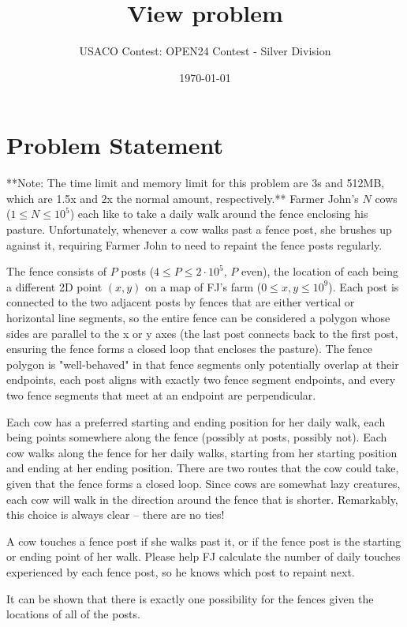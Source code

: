 \documentclass[12pt]{article}
\title{View problem}
\author{USACO Contest: OPEN24 Contest - Silver Division}
\date{\today}
\begin{document}
\maketitle

\section*{Problem Statement}


**Note: The time limit and memory limit for this problem are 3s and 512MB, which are
1.5x and 2x the normal amount, respectively.**
Farmer John's $N$ cows ($1 \leq N \leq 10^5$) each like to take a daily walk
around the fence enclosing his pasture.  Unfortunately, whenever a cow walks
past a fence post, she brushes up against it, requiring Farmer John to need to
repaint the fence posts regularly.

The fence consists of $P$ posts ($4 \leq P \leq 2\cdot 10^5$, $P$ even), the
location of each being a different 2D point $(x,y)$ on a map of FJ's farm
($0 \leq x, y \leq 10^9$).  Each post is connected to the two adjacent posts by
fences that are either vertical  or horizontal line segments, so the entire
fence can be considered a polygon whose sides are parallel to the x or y axes
(the last post connects back to the first post, ensuring the fence forms a
closed loop that encloses the pasture).  The fence polygon is "well-behaved" in
that fence segments only potentially overlap at their endpoints, each post
aligns with exactly  two fence segment endpoints, and every two fence segments
that meet at an endpoint are perpendicular. 

Each cow has a preferred starting and ending position for her daily walk, each
being points somewhere along the fence (possibly at posts, possibly not).  Each
cow walks along the fence for her daily walks, starting from her starting
position and ending at her ending position.  There are two routes that the cow
could take, given that the fence forms a closed loop.  Since cows are somewhat
lazy creatures, each cow will walk in the direction around the fence that is
shorter. Remarkably, this choice is always clear -- there are no ties!

A cow touches a fence post if she walks past it, or if the fence post is the
starting or ending point of her walk.  Please help FJ calculate the number of
daily touches experienced by each fence post, so he knows which post to repaint
next.

It can be shown that there is exactly one possibility for the fences given the
locations of all of the posts.
\end{document}
